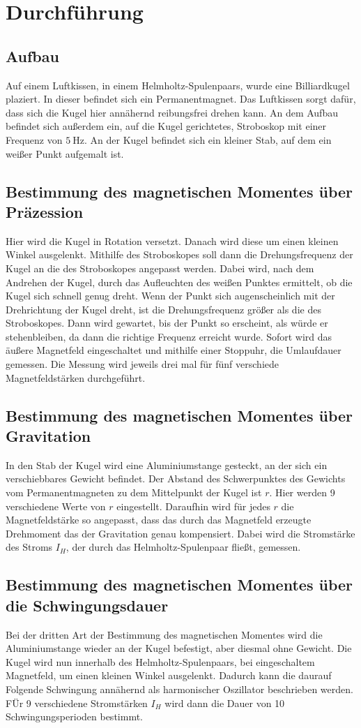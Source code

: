\section{Durchführung}
\label{sec:Durchführung}
\subsection{Aufbau}
Auf einem Luftkissen, in einem Helmholtz-Spulenpaars, wurde eine Billiardkugel plaziert.
In dieser befindet sich ein Permanentmagnet.
Das Luftkissen sorgt dafür, dass sich die Kugel hier annähernd reibungsfrei drehen kann.
An dem Aufbau befindet sich außerdem ein, auf die Kugel gerichtetes, Stroboskop mit einer Frequenz von $\qty{5}{\hertz}$.
An der Kugel befindet sich ein kleiner Stab, auf dem ein weißer Punkt aufgemalt ist.


\subsection{Bestimmung des magnetischen Momentes über Präzession}
Hier wird die Kugel in Rotation versetzt.
Danach wird diese um einen kleinen Winkel ausgelenkt.
Mithilfe des Stroboskopes soll dann die Drehungsfrequenz der Kugel an die des Stroboskopes angepasst werden.
Dabei wird, nach dem Andrehen der Kugel, durch das Aufleuchten des weißen Punktes ermittelt, ob die Kugel sich schnell genug dreht.
Wenn der Punkt sich augenscheinlich mit der Drehrichtung der Kugel dreht, ist die Drehungsfrequenz größer als die des Stroboskopes.
Dann wird gewartet, bis der Punkt so erscheint, als würde er stehenbleiben, da dann die richtige Frequenz erreicht wurde.
Sofort wird das äußere Magnetfeld eingeschaltet und mithilfe einer Stoppuhr, die Umlaufdauer gemessen.
Die Messung wird jeweils drei mal für fünf verschiede Magnetfeldstärken durchgeführt. 

\subsection{Bestimmung des magnetischen Momentes über Gravitation}
In den Stab der Kugel wird eine Aluminiumstange gesteckt, an der sich ein verschiebbares Gewicht befindet.
Der Abstand des Schwerpunktes des Gewichts vom Permanentmagneten zu dem Mittelpunkt der Kugel ist $r$.
Hier werden 9 verschiedene Werte von $r$ eingestellt. 
Daraufhin wird für jedes $r$ die Magnetfeldstärke so angepasst, dass das durch das Magnetfeld erzeugte Drehmoment das der Gravitation genau kompensiert.
Dabei wird die Stromstärke des Stroms $I_H$, der durch das Helmholtz-Spulenpaar fließt, gemessen.

\subsection{Bestimmung des magnetischen Momentes über die Schwingungsdauer}
Bei der dritten Art der Bestimmung des magnetischen Momentes wird die Aluminiumstange wieder an der Kugel befestigt, aber diesmal ohne Gewicht.
Die Kugel wird nun innerhalb des Helmholtz-Spulenpaars, bei eingeschaltem Magnetfeld, um einen kleinen Winkel ausgelenkt.
Dadurch kann die daurauf Folgende Schwingung annähernd als harmonischer Oszillator beschrieben werden.
FÜr 9 verschiedene Stromstärken $I_H$ wird dann die Dauer von 10 Schwingungsperioden bestimmt.